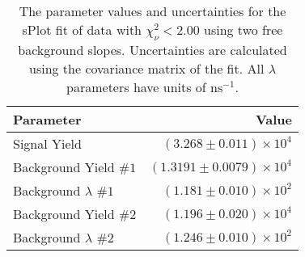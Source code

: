 
\begin{table}[ht]
    \begin{center}
        \begin{tabular}{lr}\toprule
            Parameter & Value \\\midrule
            Signal Yield & $(3.268 \pm 0.011) \times 10^{4}$ \\
            Background Yield $\#1$ & $(1.3191 \pm 0.0079) \times 10^{4}$ \\
            Background $\lambda$ $\#1$ & $(1.181 \pm 0.010) \times 10^{2}$ \\
            Background Yield $\#2$ & $(1.196 \pm 0.020) \times 10^{4}$ \\
            Background $\lambda$ $\#2$ & $(1.246 \pm 0.010) \times 10^{2}$ \\\bottomrule
        \end{tabular}
        \caption{The parameter values and uncertainties for the sPlot fit of data with $\chi^2_\nu < 2.00$ using two free background slopes. Uncertainties are calculated using the covariance matrix of the fit. All $\lambda$ parameters have units of $\si{\nano\second}^{-1}$.}\label{tab:splot-fit-results-chisqdof-2.00-free-2}
    \end{center}
\end{table}

